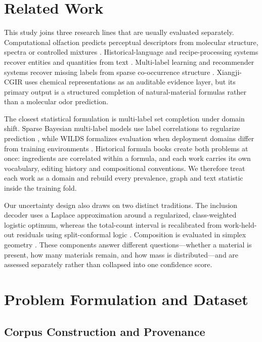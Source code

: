 \documentclass[11pt]{article}
\begin{document}
\section{Related Work}

This study joins three research lines that are usually evaluated separately. Computational olfaction predicts perceptual descriptors from molecular structure, spectra or controlled mixtures \cite{ref4,ref5,ref6,ref7,ref8,ref9,ref10}. Historical-language and recipe-processing systems recover entities and quantities from text \cite{ref11,ref12}. Multi-label learning and recommender systems recover missing labels from sparse co-occurrence structure \cite{ref13,ref16,ref17}. Xiangji-CGIR uses chemical representations as an auditable evidence layer, but its primary output is a structured completion of natural-material formulas rather than a molecular odor prediction.

The closest statistical formulation is multi-label set completion under domain shift. Sparse Bayesian multi-label models use label correlations to regularize prediction \cite{ref13}, while WILDS formalizes evaluation when deployment domains differ from training environments \cite{ref14}. Historical formula books create both problems at once: ingredients are correlated within a formula, and each work carries its own vocabulary, editing history and compositional conventions. We therefore treat each work as a domain and rebuild every prevalence, graph and text statistic inside the training fold.

Our uncertainty design also draws on two distinct traditions. The inclusion decoder uses a Laplace approximation around a regularized, class-weighted logistic optimum, whereas the total-count interval is recalibrated from work-held-out residuals using split-conformal logic \cite{ref18}. Composition is evaluated in simplex geometry \cite{ref19}. These components answer different questions—whether a material is present, how many materials remain, and how mass is distributed—and are assessed separately rather than collapsed into one confidence score.

\section{Problem Formulation and Dataset}

\subsection{Corpus Construction and Provenance}
\end{document}
